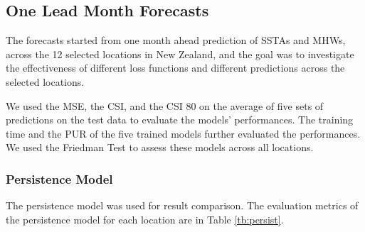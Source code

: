 \documentclass[11pt, a4paper]{article}
\begin{document}
\subsection{One Lead Month Forecasts}\label{subsec:one}

The forecasts started from one month ahead prediction of SSTAs and MHWs, across the 12 selected locations in New Zealand, and the goal was to investigate the effectiveness of different loss functions and different predictions across the selected locations.

We used the MSE, the CSI, and the CSI 80 on the average of five sets of predictions on the test data to evaluate the models' performances. The training time and the PUR of the five trained models further evaluated the performances. We used the Friedman Test to assess these models across all locations.

\subsubsection{Persistence Model}

The persistence model was used for result comparison. The evaluation metrics of the persistence model for each location are in Table \ref{tb:persist}.
\vspace{3mm}
\end{document}
